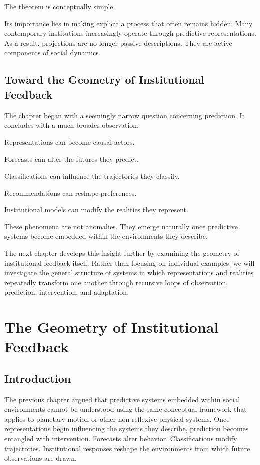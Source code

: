 \documentclass[11pt,oneside,openany]{book}
\begin{document}
The theorem is conceptually simple.

Its importance lies in making explicit a process that often remains hidden. Many contemporary institutions increasingly operate through predictive representations. As a result, projections are no longer passive descriptions. They are active components of social dynamics.

\section{Toward the Geometry of Institutional Feedback}

The chapter began with a seemingly narrow question concerning prediction. It concludes with a much broader observation.

Representations can become causal actors.

Forecasts can alter the futures they predict.

Classifications can influence the trajectories they classify.

Recommendations can reshape preferences.

Institutional models can modify the realities they represent.

These phenomena are not anomalies. They emerge naturally once predictive systems become embedded within the environments they describe.

The next chapter develops this insight further by examining the geometry of institutional feedback itself. Rather than focusing on individual examples, we will investigate the general structure of systems in which representations and realities repeatedly transform one another through recursive loops of observation, prediction, intervention, and adaptation.

\chapter{The Geometry of Institutional Feedback}

\section{Introduction}

The previous chapter argued that predictive systems embedded within social environments cannot be understood using the same conceptual framework that applies to planetary motion or other non-reflexive physical systems. Once representations begin influencing the systems they describe, prediction becomes entangled with intervention. Forecasts alter behavior. Classifications modify trajectories. Institutional responses reshape the environments from which future observations are drawn.
\end{document}
